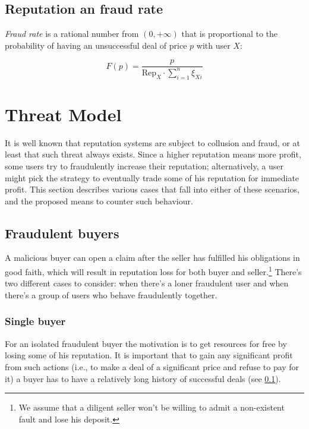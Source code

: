\documentclass[11pt]{article}
\begin{document}
\bigskip

\subsection{Reputation an fraud rate} \label{reputation:fraudRate}

\textit{Fraud rate} is a rational number from $ (0, +\infty) $ that is proportional to the probability of having an unsuccessful deal of price $ p $ with user $ X $:

\begin{equation} \label{reputationFunction}
F(p) = \frac{p}{\text{Rep}_X \cdot \sum_{i=1}^{n}\xi_{Xi}}
\end{equation}

\section{Threat Model} \label{threatModel}

It is well known \cite{ciccarelli2011collusion, maranzato2010fraud} that reputation systems are subject to collusion and fraud, or at least that such threat always exists. Since a higher reputation means more profit, some users try to fraudulently increase their reputation; alternatively, a user might 
pick the strategy to eventually trade some of his reputation for immediate profit. This section describes various cases that fall into either of these scenarios, and the proposed means to counter such behaviour.

\subsection{Fraudulent buyers} \label{threatModel:buyers}

A malicious buyer can open a claim after the seller has fulfilled his obligations in good faith, which will result in reputation loss for both buyer and seller.\footnote{We assume that a diligent seller won't be willing to admit a non-existent fault and lose his deposit.} There's two different cases to consider: when there's a loner fraudulent user and when there's a group of users who behave fraudulently together.

\subsubsection{Single buyer} \label{threatModel:buyers:single}

For an isolated fraudulent buyer the motivation is to get resources for free by losing some of his reputation. It is important that to gain any significant profit from such actions (i.e., to make a deal of a significant price and refuse to pay for it) a buyer has to have a relatively long history of successful deals (see \ref{reputation:fraudRate}).
\end{document}
